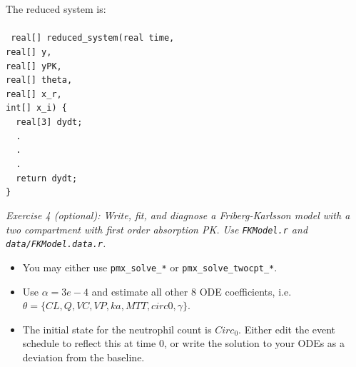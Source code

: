 \documentclass[xcolor=table]{beamer}
\begin{document}
\begin{frame}
  The reduced system is: \\ \ \\
  
    \texttt{
    real[] reduced\_system(real time, \\
    \hspace{4.4cm} real[] y, \\
    \hspace{4.4cm} \textcolor{MRGGreen}{real[] yPK}, \\
    \hspace{4.4cm} real[] theta, \\
    \hspace{4.4cm} real[] x\_r, \\
    \hspace{4.4cm} int[] x\_i) \{ \\
    \ \ real[3] dydt; \\
    \ \ . \\ \ \ . \\ \ \ . \\
    \ \ return dydt; \\ \}
  }

\end{frame}

\begin{frame}

\textit{\textcolor{MRGGreen}{Exercise 4 (optional)}: Write, fit, and diagnose a Friberg-Karlsson model
with a two compartment with first order absorption PK. Use \texttt{FKModel.r}
and \texttt{data/FKModel.data.r}.} 

\end{frame}

\begin{frame}

\begin{itemize}
  \item You may either use \texttt{pmx\_solve\_*} or \texttt{pmx\_solve\_twocpt\_*}.
  \item Use $\alpha = 3e-4$ and estimate all other 8 ODE coefficients,
  i.e. $\theta = \{ CL, Q, VC, VP, ka, MTT, circ0, \gamma \}$.
  \item The initial state for the neutrophil count is $Circ_0$. 
  Either edit the event schedule to reflect this at time 0, 
  or write the solution to your ODEs as a deviation from the baseline.
 \end{itemize}

\end{frame}
\end{document}
